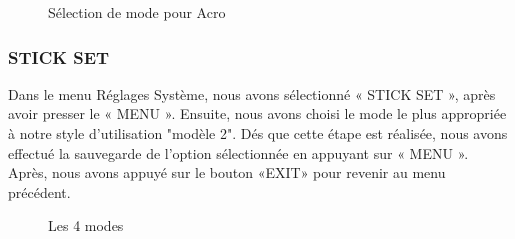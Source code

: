\begin{figure}[H]
	\begin{center}
		\centering
	\end{center}
	\caption{Sélection de mode pour Acro}
\end{figure}
	\subsubsection{STICK SET }
	Dans le menu Réglages Système, nous avons sélectionné « STICK SET », après avoir presser le « MENU ». Ensuite, nous avons choisi le mode le plus appropriée à notre style d'utilisation "modèle 2". Dés que cette étape est réalisée, nous avons effectué la sauvegarde de l'option sélectionnée en appuyant sur « MENU ». Après, nous avons appuyé sur le bouton «EXIT» pour revenir au menu précédent.
	\begin{figure}[H]
		\begin{center}
			\centering
		\end{center}
		\caption{Les 4 modes}
	\end{figure}

